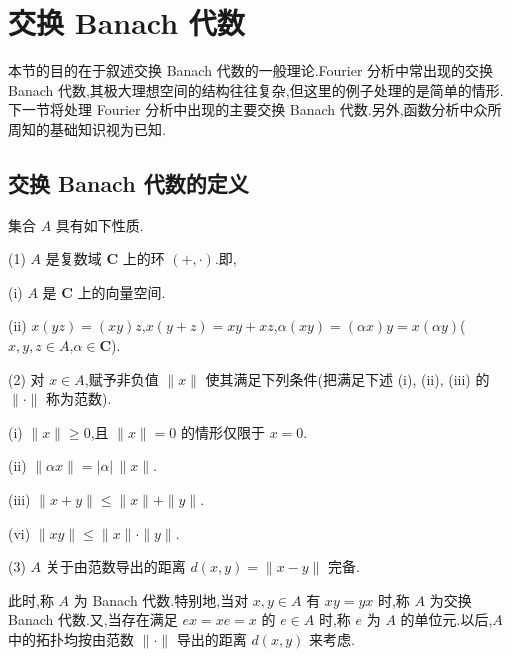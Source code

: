 \section{交换 Banach 代数}\label{sec:3.1}


本节的目的在于叙述交换 Banach 代数的一般理论.Fourier 分析中常出现的交换 Banach 代数,其极大理想空间的结构往往复杂,但这里的例子处理的是简单的情形.下一节将处理 Fourier 分析中出现的主要交换 Banach 代数.另外,函数分析中众所周知的基础知识视为已知.

\subsection{交换 Banach 代数的定义}\label{sec:3.1.1}

\begin{definition}\label{def:3.1.1}
集合 $A$ 具有如下性质.

(1) $A$ 是复数域 $\mathbf{C}$ 上的环 $(+, \cdot)$.即,

(i) $A$ 是 $\mathbf{C}$ 上的向量空间.

(ii) $x(yz) = (xy)z$,$x(y + z) = xy + xz$,$\alpha(xy) = (\alpha x)y = x(\alpha y)$($x, y, z \in A$,$\alpha \in \mathbf{C}$).

(2) 对 $x \in A$,赋予非负值 $\|x\|$ 使其满足下列条件(把满足下述 (i), (ii), (iii) 的 $\|\cdot\|$ 称为范数).

(i) $\|x\| \geq 0$,且 $\|x\| = 0$ 的情形仅限于 $x = 0$.

(ii) $\|\alpha x\| = |\alpha|\,\|x\|$.

(iii) $\|x + y\| \leq \|x\| + \|y\|$.

(vi) $\|xy\| \leq \|x\| \cdot \|y\|$.

(3) $A$ 关于由范数导出的距离 $d(x, y) = \|x - y\|$ 完备.

此时,称 $A$ 为 Banach 代数.特别地,当对 $x, y \in A$ 有 $xy = yx$ 时,称 $A$ 为交换 Banach 代数.又,当存在满足 $ex = xe = x$ 的 $e \in A$ 时,称 $e$ 为 $A$ 的单位元.以后,$A$ 中的拓扑均按由范数 $\|\cdot\|$ 导出的距离 $d(x, y)$ 来考虑.
\end{definition}

